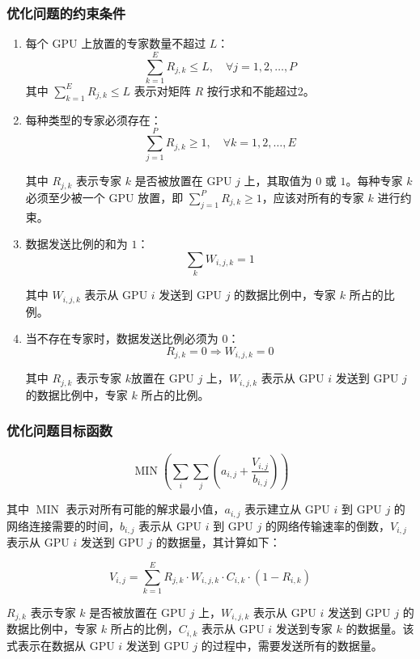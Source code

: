 \subsubsection{优化问题的约束条件}

\begin{enumerate}

    \item  每个 GPU 上放置的专家数量不超过 $L$：
$$\sum_{k=1}^{E} R_{j,k} \leq L, \quad \forall j=1,2,\ldots,P$$
其中 $\sum_{k=1}^{E} R_{j,k} \leq L$ 表示对矩阵 $R$ 按行求和不能超过2。

\item 每种类型的专家必须存在：
$$\sum_{j=1}^{P} R_{j,k} \geq 1, \quad \forall k=1,2,\ldots,E$$

其中 $R_{j,k}$ 表示专家 $k$ 是否被放置在 GPU $j$ 上，其取值为 $0$ 或 $1$。每种专家 $k$ 必须至少被一个 GPU 放置，即 $\sum_{j=1}^{P} R_{j,k} \geq 1$，应该对所有的专家 $k$ 进行约束。

\item 数据发送比例的和为 $1$：
$$\sum_k W_{i,j,k} = 1$$

其中 $W_{i,j,k}$ 表示从 GPU $i$ 发送到 GPU $j$ 的数据比例中，专家 $k$ 所占的比例。

\item 当不存在专家时，数据发送比例必须为 $0$：
$$R_{j,k} = 0 \Rightarrow W_{i,j,k} = 0$$

其中 $R_{j,k}$ 表示专家 $k$放置在 GPU $j$ 上，$W_{i,j,k}$ 表示从 GPU $i$ 发送到 GPU $j$ 的数据比例中，专家 $k$ 所占的比例。
\end{enumerate}

\subsubsection{优化问题目标函数}



$$  \operatorname{MIN} \left( \sum_i \sum_j \left( a_{i,j} + \frac{V_{i,j}}{b_{i,j}} \right) \right)$$

其中 $\operatorname{MIN}$ 表示对所有可能的解求最小值，$a_{i,j}$ 表示建立从 GPU $i$ 到 GPU $j$ 的网络连接需要的时间，$b_{i,j}$ 表示从 GPU $i$ 到 GPU $j$ 的网络传输速率的倒数，$V_{i,j}$ 表示从 GPU $i$ 发送到 GPU $j$ 的数据量，其计算如下：

$$V_{i,j} = \sum_{k=1}^{E} R_{j,k} \cdot W_{i,j,k} \cdot C_{i,k} \cdot \left(1-R_{i,k}\right)$$

$R_{j,k}$ 表示专家 $k$ 是否被放置在 GPU $j$ 上，$W_{i,j,k}$ 表示从 GPU $i$ 发送到 GPU $j$ 的数据比例中，专家 $k$ 所占的比例，$C_{i,k}$ 表示从 GPU $i$ 发送到专家 $k$ 的数据量。该式表示在数据从 GPU $i$ 发送到 GPU $j$ 的过程中，需要发送所有的数据量。

